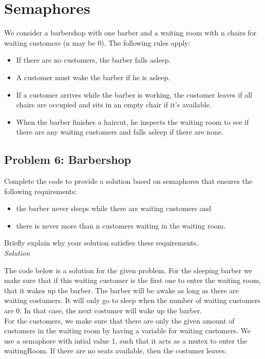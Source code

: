 \section{Semaphores}

We consider a barbershop with one barber and a waiting room with n chairs for waiting customers
(n may be 0). The following rules apply:

\begin{itemize}
    \item If there are no customers, the barber falls asleep.
    \item A customer must wake the barber if he is asleep.
    \item If a customer arrives while the barber is working, the customer leaves if all chairs are
    occupied and sits in an empty chair if it’s available.
    \item When the barber finishes a haircut, he inspects the waiting room to see if there are any
    waiting customers and falls asleep if there are none.
\end{itemize}


\subsection{Problem 6: Barbershop}

Complete the code to provide a solution based on semaphores
that ensures the following requirements:
\begin{itemize}
    \item the barber never sleeps while there are waiting customers and
    \item there is never more than n customers waiting in the waiting room.
\end{itemize}

Briefly explain why your solution satisfies these requirements. \\

\textit{Solution}

The code below is a solution for the given problem. 
For the sleeping barber we make sure that if this waiting customer is the first one to enter the waiting room, that it wakes up the barber. 
The barber will be awake as long as there are waiting costumers. It will only go to sleep when the number of waiting customers are 0. In that case, the next costumer will wake up the barber. \\

For the customers, we make sure that there are only the given amount of customers in the waiting room by having a variable for waiting customers. 
We use a semaphore with intial value 1, such that it acts as a mutex to enter the waitingRoom. If there are no seats available, then the costumer leaves.  


